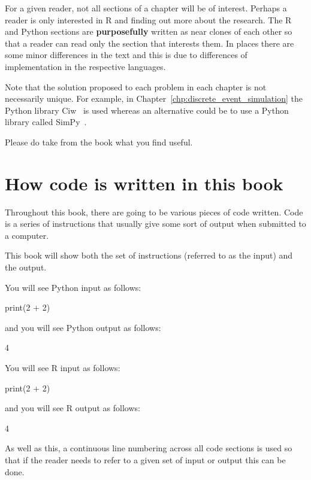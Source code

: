 For a given reader, not all sections of a chapter will be of interest.
Perhaps a reader is only interested in R and finding out more about the
research.
The R and Python sections are \textbf{purposefully} written as near clones of
each other so that a reader can read only the section that interests them.
In places there are some minor differences in the text and this is due to
differences of implementation in the respective languages.

Note that the solution proposed to each problem in each chapter is not
necessarily unique. For example, in Chapter~\ref{chp:discrete_event_simulation}
the Python library Ciw~\cite{ciwpython, palmer2019ciw}
is used whereas an alternative could be to use a Python
library called SimPy~\cite{simpy}.

Please do take from the book what you find useful.

\section{How code is written in this book}\label{sec:how-code-is-written-in-this-book}

Throughout this book, there are going to be various pieces of code written. Code
is a series of instructions that usually give some sort of output when submitted
to a computer.

This book will show both the set of instructions (referred to as the input) and
the output.

You will see Python input as follows:

\begin{pyin}
print(2 + 2)
\end{pyin}

and you will see Python output as follows:

\begin{pyout}
4
\end{pyout}

You will see R input as follows:

\begin{Rin}
print(2 + 2)
\end{Rin}

and you will see R output as follows:

\begin{Rout}
[1] 4
\end{Rout}

As well as this, a continuous line numbering across all code sections is used so
that if the reader needs to refer to a given set of input or output this can be
done.

